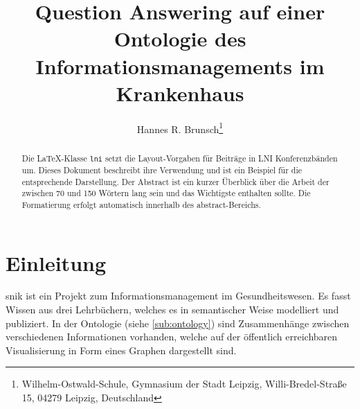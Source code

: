 \documentclass[utf8,biblatex]{lni}
\begin{document}
\title[Question Answering auf SNIK]{Question Answering auf einer Ontologie des Informationsmanagements im Krankenhaus}
\author[Hannes R. Brunsch]%
{Hannes R. Brunsch\footnote{Wilhelm-Ostwald-Schule, Gymnasium der Stadt Leipzig, Willi-Bredel-Straße 15, 04279 Leipzig, Deutschland }}
\maketitle

\begin{abstract}
Die \LaTeX-Klasse \texttt{lni} setzt die Layout-Vorgaben für Beiträge in LNI Konferenzbänden um.
Dieses Dokument beschreibt ihre Verwendung und ist ein Beispiel für die entsprechende Darstellung.
Der Abstract ist ein kurzer Überblick über die Arbeit der zwischen 70 und 150 Wörtern lang sein und das Wichtigste enthalten sollte.
Die Formatierung erfolgt automatisch innerhalb des abstract-Bereichs.
\end{abstract}




\section{Einleitung}

\ac{snik} ist ein Projekt zum Informationsmanagement im Gesundheitswesen.
Es fasst Wissen aus drei Lehrbüchern, welches es in semantischer Weise modelliert und publiziert.
In der Ontologie (siehe \cref{sub:ontology}) sind Zusammenhänge zwischen verschiedenen Informationen vorhanden,
welche auf der öffentlich erreichbaren Visualisierung in Form eines Graphen dargestellt sind.
\end{document}
